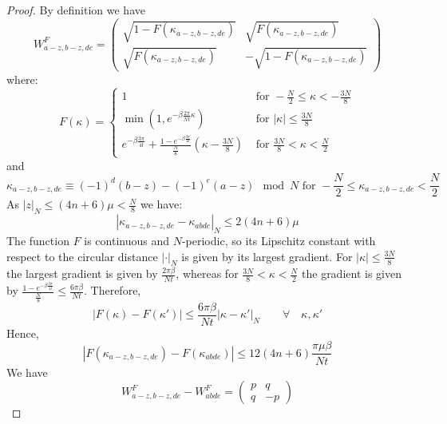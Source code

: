 \documentclass[aps,floatfix,10pt,amssymb,amsfont,amsmath,superscriptaddress,float,nofootinbib,longbibliography,nobalancelastpage,twocolumn]{revtex4-2}
\begin{document}
\begin{proof}
    By definition we have
\begin{equation}
     W^F_{a-z,b-z,de} = \begin{pmatrix}
        \sqrt{1 - F(\kappa_{a-z,b-z,de})} & \sqrt{F(\kappa_{a-z,b-z,de})}\\
       \sqrt{F(\kappa_{a-z,b-z,de})} & -\sqrt{1 - F(\kappa_{a-z,b-z,de})}
    \end{pmatrix}
\end{equation}
where:
\begin{equation}
    F(\kappa) = \begin{cases}1& \text{ for }  -\frac{N}{2} \leq \kappa <  -\frac{3N}{8}\\
        \min(1,e^{-\beta \frac{2\pi}{Nt} \kappa}) & \text{ for } |\kappa|\leq \frac{3N}{8}\\
        e^{-\beta\frac{3\pi}{4t}} + \frac{1- e^{-\beta\frac{3\pi}{4t}}}{\frac{N}{8}}(\kappa - \frac{3N}{8}) & \text{ for }  \frac{3N}{8} < \kappa <  \frac{N}{2}
    \end{cases}
\end{equation}
and
\begin{equation}
    \kappa_{a-z,b-z,de} \equiv (-1)^d(b-z) - (-1)^e(a-z) \mod N \text{ for } -\frac{N}{2} \leq \kappa_{a-z,b-z,de} < \frac{N}{2}
\end{equation}
As $|z|_{N} \leq (4n+6)\mu< \frac{N}{8}$  we have:
\begin{equation}
    |\kappa_{a-z,b-z,de} - \kappa_{abde}|_{N} \leq 2(4n+6)\mu
\end{equation}
The function $F$ is continuous and $N$-periodic, so its Lipschitz constant with respect to the circular distance $|\cdot|_{N}$ is given by its largest gradient. For $|\kappa|\leq \frac{3N}{8}$ the largest gradient is given by $\frac{2\pi\beta}{Nt}$, whereas for $ \frac{3N}{8} < \kappa <  \frac{N}{2}$ the gradient is given by $\frac{1- e^{-\beta\frac{3\pi}{4t}}}{\frac{N}{8}} \leq \frac{6\pi\beta}{Nt}$. Therefore,
\begin{equation}
     |F(\kappa)-F(\kappa')|\leq \frac{6\pi\beta}{Nt}|\kappa - \kappa'|_{N} \qquad \forall \quad \kappa, \kappa'
\end{equation}
Hence,
\begin{equation}
    |F(\kappa_{a-z,b-z,de})-F(\kappa_{abde})|\leq 12(4n+6)\frac{\pi\mu\beta}{Nt}
\end{equation}
We have
\begin{equation}
    W^F_{a-z,b-z,de}-W^F_{abde}=\begin{pmatrix} p & q\\ q & -p\end{pmatrix}

\end{equation}
\end{proof}
\end{document}
